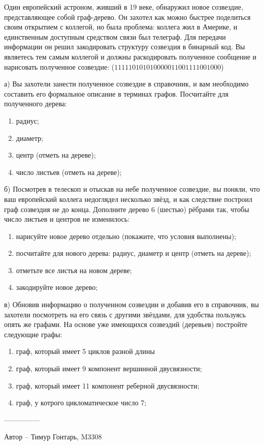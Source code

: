 \question
Один европейский астроном, живший в 19 веке, обнаружил новое созвездие, представляющее собой граф-дерево. Он захотел как можно быстрее поделиться своим открытием с коллегой, но была проблема: коллега жил в Америке, и единственным доступным средством связи был телеграф. Для передачи информации он решил закодировать структуру созвездия в бинарный код. Вы являетесь тем самым коллегой и должны раскодировать полученное сообщение и нарисовать полученное созвездие: ($111110101010000011001111001000$)

а) Вы захотели занести полученное созвездие в справочник, и вам необходимо составить его формальное описание в терминах графов. Посчитайте для полученного дерева:
\begin{enumerate}
\item радиус;
\item диаметр;
\item центр (отметь на дереве);
\item число листьев (отметь на дереве);
\end{enumerate}

б) Посмотрев в телескоп и отыскав на небе полученное созвездие, вы поняли, что ваш европейский коллега недоглядел несколько звёзд, и как следствие построил граф созвездия не до конца. Дополните дерево 6 (шестью) рёбрами так, чтобы число листьев и центров не изменилось:
\begin{enumerate}
\item нарисуйте новое дерево отдельно (покажите, что условия выполнены);
\item посчитайте для нового дерева: радиус, диаметр и центр (отметь на дереве);
\item отметьте все листья на новом дереве;
\item закодируйте новое дерево;
\end{enumerate}

в) Обновив информацию о полученном созвездии и добавив его в справочник, вы захотели посмотреть на его связь с другими звёздами, для удобства пользуясь опять же графами. На основе уже имеющихся созвездий (деревьев) постройте следующие графы:
\begin{enumerate}
\item граф, который имеет 5 циклов разной длины
\item граф, который имеет 9 компонент вершинной двусвязности;
\item граф, который имеет 11 компонент реберной двусвязности;
\item граф, у котрого цикломатическое число 7;
\end{enumerate}

---------------

Автор -- Тимур Гонтарь, M3308
